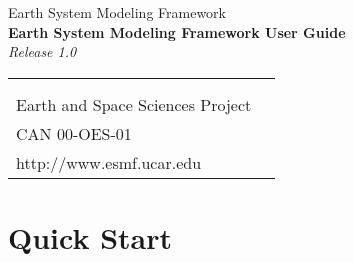 \documentclass[]{article}
\begin{document}

\begin{titlepage}

\begin{center}
{\Large Earth System Modeling Framework } \\
\vspace{.25in}
{\Large {\bf Earth System Modeling Framework User Guide}} \\
\vspace{.25in}
{\large {\it Release 1.0}}
\vspace{.5in}
\end{center}

\begin{latexonly}
\vspace{5.5in}
\begin{tabular}{p{5in}p{.9in}}
\hrulefill \\
\noindent {\bf NASA High Performance Computing and Communications Program} \\
\noindent Earth and Space Sciences Project \\
\noindent CAN 00-OES-01 \\
\noindent http://www.esmf.ucar.edu \\
\end{tabular}
\end{latexonly}

\end{titlepage}

\tableofcontents

\newpage

\setlength{\parskip}{2ex}
\setlength{\parindent}{0ex}





\newpage
\section{Quick Start}


\end{document}
